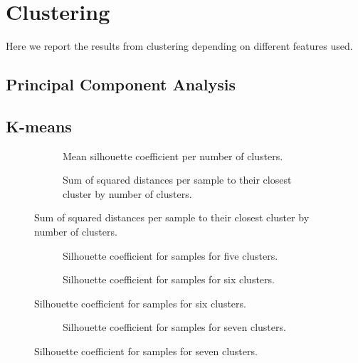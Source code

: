 %


\section{Clustering}
Here we report the results from clustering depending on different features used.



\subsection{Principal Component Analysis}


\subsection{K-means}

\begin{figure}
	\begin{subfigure}[b]{\textwidth}
		
		\caption{Mean silhouette coefficient per number of clusters.}
	\end{subfigure}
	\begin{subfigure}[b]{\textwidth}
		
		\caption{Sum of squared distances per sample to their closest cluster by number of clusters.}
	\end{subfigure}
\end{figure}

\begin{figure}
	\begin{subfigure}[b]{\textwidth}
		
		\caption{Silhouette coefficient for samples for five clusters.}
	\end{subfigure}
	\begin{subfigure}[b]{\textwidth}
		
		\caption{Silhouette coefficient for samples for six clusters.}
	\end{subfigure}
\end{figure}
\begin{figure}
	\ContinuedFloat
	\begin{subfigure}[b]{\textwidth}
		
		\caption{Silhouette coefficient for samples for seven clusters.}
	\end{subfigure}
\end{figure}

